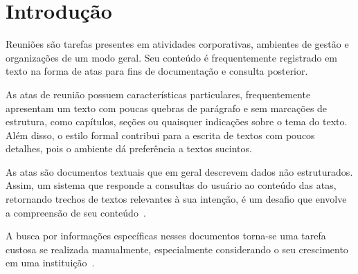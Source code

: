 \chapter{Introdução}\label{chap:introducao}




Reuniões são tarefas presentes em atividades corporativas, ambientes de gestão e organizações de um modo geral. Seu conteúdo é frequentemente registrado em texto na forma de atas para fins de documentação e consulta posterior. 




%   

As atas de reunião possuem características particulares, frequentemente apresentam um texto com poucas quebras de parágrafo e sem marcações de estrutura, como capítulos, seções ou quaisquer indicações sobre o tema do texto. Além disso, o estilo formal contribui para a escrita de textos com poucos detalhes, pois o ambiente dá preferência a textos sucintos. 











As atas são documentos textuais que em geral descrevem dados não estruturados. Assim, um sistema que responde a consultas do usuário ao conteúdo das atas, retornando trechos de textos relevantes à sua intenção, é um desafio que envolve a compreensão de seu conteúdo~\cite{Bokaei2015}. 



A busca por informações específicas nesses documentos torna-se uma tarefa custosa se realizada manualmente, especialmente considerando o seu crescimento em uma instituição~\cite{Lee2011, Masakazu2013, Miriam2013}.







